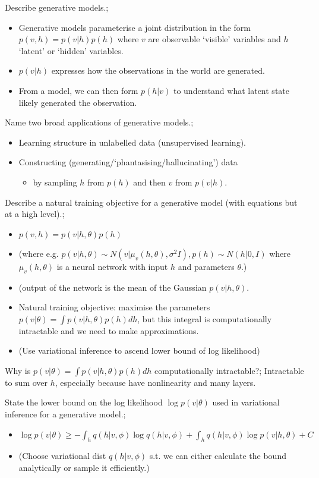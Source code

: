 \documentclass{article}
\begin{document}
Describe generative models.; \begin{itemize}
    \item Generative models parameterise a joint distribution in the form $p(v, h)=p(v|h)p(h)$ where $v$ are observable `visible' variables and $h$ `latent' or `hidden' variables.
    \item $p(v|h)$ expresses how the observations in the world are generated.
    \item From a model, we can then form $p(h|v)$ to understand what latent state likely generated the observation.
\end{itemize}

Name two broad applications of generative models.; \begin{itemize}
    \item Learning structure in unlabelled data (unsupervised learning).
    \item Constructing (generating/`phantasising/hallucinating') data \begin{itemize}
        \item by sampling $h$ from $p(h)$ and then $v$ from $p(v|h)$.
    \end{itemize}
\end{itemize}

Describe a natural training objective for a generative model (with equations but at a high level).; \begin{itemize}
    \item $p(v, h) = p(v|h, \theta)p(h)$ 
    \item (where e.g. $p(v|h, \theta) \sim N(v| \mu_v(h,\theta), \sigma^2I), p(h)\sim N(h|0, I)$ where $\mu_v(h, \theta)$ is a neural network with input $h$ and parameters $\theta$.)
    \item (output of the network is the mean of the Gaussian $p(v|h, \theta)$.
    \item Natural training objective: maximise the parameters $p(v|\theta) = \int p(v|h, \theta)p(h)dh$, but this integral is computationally intractable and we need to make approximations.
    \item (Use variational inference to ascend lower bound of log likelihood)
\end{itemize}

Why is $p(v|\theta) = \int p(v|h, \theta)p(h)dh$ computationally intractable?; Intractable to sum over $h$, especially because have nonlinearity and many layers. 

State the lower bound on the log likelihood $\log p(v|\theta)$ used in variational inference for a generative model.; \begin{itemize}
    \item $\log p(v|\theta) \geq - \int_h q(h|v, \phi)\log q(h|v, \phi) + \int_h q(h|v, \phi)\log p(v|h, \theta) + C$
    \item (Choose variational dist $q(h|v, \phi)$ s.t. we can either calculate the bound analytically or sample it efficiently.)
\end{itemize}
\end{document}
